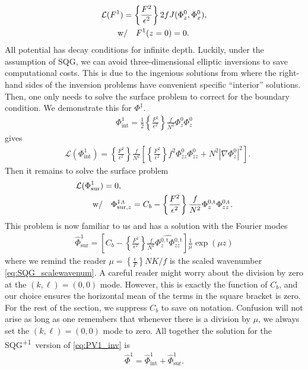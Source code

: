 \documentclass[11pt,letterpaper]{article}
\newcommand{\pl}{\textsuperscript{+1}}
\newcommand{\Busqrt}{\left\{\frac{\epsilon}{F}\right\}}
\newcommand{\Ub}{\left\{\frac{F^2}{\epsilon^2}\right\}}
\begin{document}
\begin{align}
    &\mathcal{L}(F^1) = \Ub 2f J(\Phi_z^0,\Phi_x^0),\label{eq:F_inv}\\
    &\quad \qdt{w/} F^1(z=0)=0.
\end{align}
All potential has decay conditions for infinite depth. Luckily, under the assumption of SQG, we can avoid three-dimensional elliptic inversions to save computational costs. This is due to the ingenious solutions from \citet[Appendix A]{HakimEtAl_02} where the right-hand sides of the inversion problems have convenient specific ``interior'' solutions. Then, one only needs to solve the surface problem to correct for the boundary condition. We demonstrate this for $\Phi^1$.
\begin{align}
    \Phi^1_\text{int} = \frac{1}{2}\Ub \frac{f}{N^2} \Phi^0_z\Phi^0_z
\end{align}
gives
\begin{align}
    &\mathcal{L}(\Phi^1_\text{int})
    = \Ub \frac{f}{N^2} \left[\Ub f^2\Phi^0_{zz}\Phi^0_{zz}+N^2|\nabla\Phi^0_z|^2\right].
\end{align}
Then it remains to solve the surface problem
\begin{align}
    &\mathcal{L}(\Phi^1_\text{sur})
    = 0,\\
    &\quad \qdt{w/} \Phi^{1,\text{t}}_{\text{sur},z} = C_b-\Ub \frac{f}{N^2}\Phi^{0,\text{t}}_z\Phi^{0,\text{t}}_{zz}.
\end{align}
This problem is now familiar to us and has a solution with the Fourier modes
\begin{align}
    \hat\Phi^1_\text{sur} = \left[C_b-\Ub \frac{f}{N^2}\widehat{\Phi^{0,\text{t}}_z\Phi^{0,\text{t}}_{zz}}\right]\frac{1}{\mu}\exp\left(\mu z\right)
\end{align}
where we remind the reader $\mu = \Busqrt NK/f$ is the scaled wavenumber \eqref{eq:SQG_scalewavenum}. A careful reader might worry about the division by zero at the $(k,\ell)=(0,0)$ mode. However, this is exactly the function of $C_b$, and our choice ensures the horizontal mean of the terms in the square bracket is zero. For the rest of the section, we suppress $C_b$ to save on notation. Confusion will not arise as long as one remembers that whenever there is a division by $\mu$, we always set the $(k,\ell)=(0,0)$ mode to zero. All together the solution for the SQG\pl~version of \eqref{eq:PV1_inv} is
\begin{align}
    \hat\Phi^1 = \hat\Phi^1_\text{int}+\hat\Phi^1_\text{sur}.
\end{align}
\end{document}
